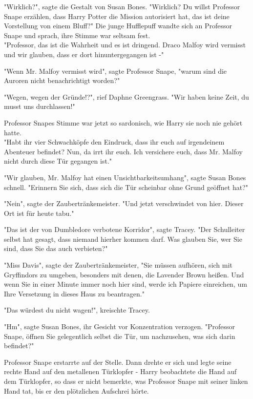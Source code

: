 {"Wirklich?", sagte die Gestalt von Susan Bones. "Wirklich? Du willst Professor Snape erzählen, dass Harry Potter die Mission autorisiert hat, das ist deine Vorstellung von einem Bluff?" Die junge Hufflepuff wandte sich an Professor Snape und sprach, ihre Stimme war seltsam fest.\\ "Professor, das ist die Wahrheit und es ist dringend. Draco Malfoy wird vermisst und wir glauben, dass er dort hinuntergegangen ist -"

"Wenn Mr. Malfoy vermisst wird", sagte Professor Snape, "warum sind die Auroren nicht benachrichtigt worden?"

"Wegen, wegen der Gründe!?", rief Daphne Greengrass. "Wir haben keine Zeit, du musst uns durchlassen!"

Professor Snapes Stimme war jetzt so sardonisch, wie Harry sie noch nie gehört hatte.\\ "Habt ihr vier Schwachköpfe den Eindruck, dass ihr euch auf irgendeinem Abenteuer befindet? Nun, da irrt ihr euch. Ich versichere euch, dass Mr. Malfoy nicht durch diese Tür gegangen ist."

"Wir glauben, Mr. Malfoy hat einen Unsichtbarkeitsumhang", sagte Susan Bones schnell. "Erinnern Sie sich, dass sich die Tür scheinbar ohne Grund geöffnet hat?"

"Nein", sagte der Zaubertränkemeister. "Und jetzt verschwindet von hier. Dieser Ort ist für heute tabu."

"Das ist der von Dumbledore verbotene Korridor", sagte Tracey. "Der Schulleiter selbst hat gesagt, dass niemand hierher kommen darf. Was glauben Sie, wer Sie sind, dass Sie das auch verbieten?"

"Miss Davis", sagte der Zaubertränkemeister, "Sie müssen aufhören, sich mit Gryffindors zu umgeben, besonders mit denen, die Lavender Brown heißen. Und wenn Sie in einer Minute immer noch hier sind, werde ich Papiere einreichen, um Ihre Versetzung in dieses Haus zu beantragen."

"Das würdest du nicht wagen!", kreischte Tracey.

"Hm", sagte Susan Bones, ihr Gesicht vor Konzentration verzogen. "Professor Snape, öffnen Sie gelegentlich selbst die Tür, um nachzusehen, was sich darin befindet?"

Professor Snape erstarrte auf der Stelle. Dann drehte er sich und legte seine rechte Hand auf den metallenen Türklopfer - Harry beobachtete die Hand auf dem Türklopfer, so dass er nicht bemerkte, was Professor Snape mit seiner linken Hand tat, bis er den plötzlichen Aufschrei hörte.

}
